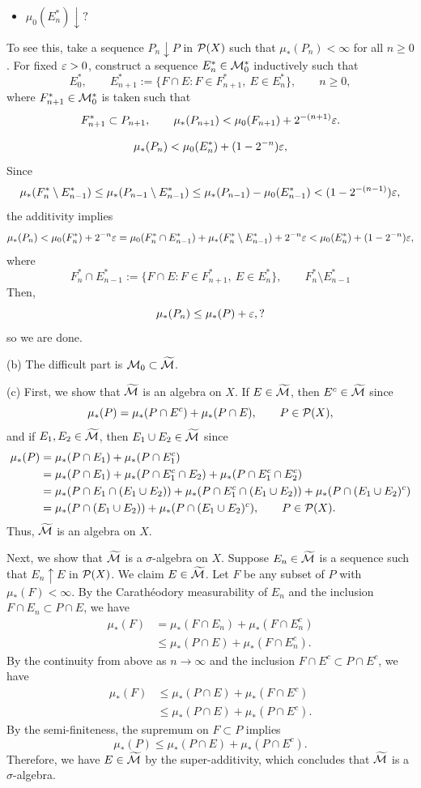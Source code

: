 \documentclass{../../large}
\begin{document}
\begin{pf}
\begin{itemize}
This implies that $\mu_*(E)=\mu_0(E)$ for $E\in\cM_0$.

\item
$\mu_0(E_n^*)\downarrow?$
\end{itemize}


To see this, take a sequence $P_n\downarrow P$ in $\mathcal{P}(X)$ such that $\mu_*(P_n)<\infty$ for all $n\ge0$.
For fixed $\varepsilon>0$, construct a sequence $E_n^*\in\mathcal{M}_0^*$ inductively such that
\[E^*_0,\qquad E^*_{n+1}:=\{F\cap E:F\in F^*_{n+1},\ E\in E^*_n\},\qquad n\ge0,\]
where $F_{n+1}^*\in\mathcal{M}_0^*$ is taken such that 
\[F_{n+1}^*\subset P_{n+1},\qquad \mu_*(P_{n+1})<\mu_0(F_{n+1})+2^{-(n+1)}\varepsilon.\]



\[\mu_*(P_n)<\mu_0(E^*_n)+(1-2^{-n})\varepsilon,\]
Since
\[\mu_*(F_n^*\setminus E_{n-1}^*)\le\mu_*(P_{n-1}\setminus E_{n-1}^*)\le\mu_*(P_{n-1})-\mu_0(E_{n-1}^*)<(1-2^{-(n-1)})\varepsilon,\]
the additivity implies
\[\mu_*(P_n)<\mu_0(F_n^*)+2^{-n}\varepsilon
=\mu_0(F_n^*\cap E_{n-1}^*)+\mu_*(F_n^*\setminus E_{n-1}^*)+2^{-n}\varepsilon<\mu_0(E_n^*)+(1-2^{-n})\varepsilon,\]
where
\[F_n^*\cap E_{n-1}^*:=\{F\cap E:F\in F^*_{n+1},\ E\in E^*_n\},\qquad F_n^*\setminus E_{n-1}^*\]
Then,
\[\mu_*(P_n)\le\mu_*(P)+\varepsilon,?\]
so we are done.

(b)
The difficult part is $\mathcal{M}_0\subset\widetilde{\mathcal{M}}$.


(c)
First, we show that $\widetilde{\mathcal{M}}$ is an algebra on $X$.
If $E\in\widetilde{\mathcal{M}}$, then $E^c\in\widetilde{\mathcal{M}}$ since
\[\mu_*(P)=\mu_*(P\cap E^c)+\mu_*(P\cap E),\qquad P\in\mathcal{P}(X),\]
and if $E_1,E_2\in\widetilde{\mathcal{M}}$, then $E_1\cup E_2\in\widetilde{\mathcal{M}}$ since
\begin{align*}
\mu_*(P)
&=\mu_*(P\cap E_1)+\mu_*(P\cap E_1^c)\\
&=\mu_*(P\cap E_1)+\mu_*(P\cap E_1^c\cap E_2)+\mu_*(P\cap E_1^c\cap E_2^c)\\
&=\mu_*(P\cap E_1\cap(E_1\cup E_2))+\mu_*(P\cap E_1^c\cap(E_1\cup E_2))+\mu_*(P\cap(E_1\cup E_2)^c)\\
&=\mu_*(P\cap(E_1\cup E_2))+\mu_*(P\cap(E_1\cup E_2)^c),\qquad P\in\mathcal{P}(X).
\end{align*}
Thus, $\widetilde{\mathcal{M}}$ is an algebra on $X$.

Next, we show that $\widetilde{\mathcal{M}}$ is a $\sigma$-algebra on $X$.
Suppose $E_n\in\widetilde{\mathcal{M}}$ is a sequence such that $E_n\uparrow E$ in $\mathcal{P}(X)$.
We claim $E\in\widetilde{\mathcal{M}}$.
Let $F$ be any subset of $P$ with $\mu_*(F)<\infty$.
By the Carath\'eodory measurability of $E_n$ and the inclusion $F\cap E_n\subset P\cap E$, we have
\begin{align*}
\mu_*(F)
&=\mu_*(F\cap E_n)+\mu_*(F\cap E_n^c)\\
&\le\mu_*(P\cap E)+\mu_*(F\cap E_n^c).
\end{align*}
By the continuity from above as $n\to\infty$ and the inclusion $F\cap E^c\subset P\cap E^c$, we have
\begin{align*}
\mu_*(F)
&\le\mu_*(P\cap E)+\mu_*(F\cap E^c)\\
&\le\mu_*(P\cap E)+\mu_*(P\cap E^c).
\end{align*}
By the semi-finiteness, the supremum on $F\subset P$ implies
\[\mu_*(P)\le\mu_*(P\cap E)+\mu_*(P\cap E^c).\]
Therefore, we have $E\in\widetilde{\mathcal{M}}$ by the super-additivity, which concludes that $\widetilde{\mathcal{M}}$ is a $\sigma$-algebra.


\end{pf}
\end{document}

